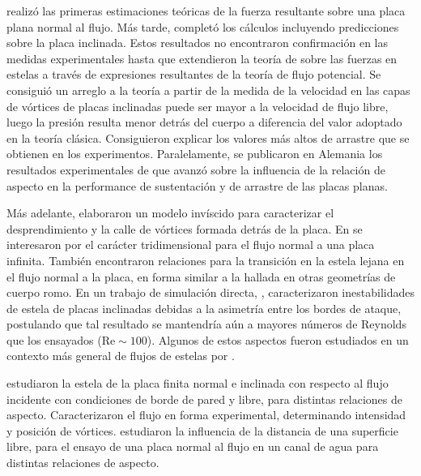 \documentclass[spanish]{article}
\begin{document}
	\citet{kirchhoff1869theorie} realizó las primeras estimaciones teóricas de la fuerza resultante sobre una placa plana normal al flujo. Más tarde, \citet{rayleigh1911xxiii} completó los cálculos incluyendo predicciones sobre la placa inclinada. Estos resultados no encontraron confirmación en las medidas experimentales hasta que \citet{fage1927flow} extendieron la teoría de \citet{vonkarman1911} sobre las fuerzas en estelas a través de expresiones resultantes de la teoría de flujo potencial. Se consiguió un arreglo a la teoría a partir de la medida de la velocidad en las capas de vórtices de placas inclinadas puede ser mayor a la velocidad de flujo libre, luego la presión resulta menor detrás del cuerpo a diferencia del valor adoptado en la teoría clásica. Consiguieron explicar los valores más altos de arrastre que se obtienen en los experimentos.
		Paralelamente, se publicaron  en Alemania los resultados experimentales de \citet{flachsbart1932} que avanzó sobre la influencia de la relación de aspecto en la performance de sustentación y de arrastre de las placas planas.
	
	
	Más adelante, \citet{kiya1977contribution} elaboraron un modelo invíscido para caracterizar el desprendimiento y la calle de vórtices formada detrás de la placa. En \cite{najjar1995effects, najjar1998low} se interesaron por el carácter tridimensional para el flujo normal a una placa infinita. También \cite{saha2007far} encontraron relaciones para la transición en la estela lejana en el flujo normal a la placa, en forma similar a la hallada en otras geometrías de cuerpo romo. En un trabajo de simulación directa, \cite{yang2012vortex}, caracterizaron inestabilidades de estela de placas inclinadas debidas a la asimetría entre los bordes de ataque, postulando que tal resultado se mantendría aún a mayores números de Reynolds que los ensayados ($\mathrm{Re}\sim100$). Algunos de estos aspectos fueron estudiados en un contexto más general de flujos de estelas por \cite{panesar2023oblique}.

	\cite{gomez2022wake} estudiaron la estela de la placa finita normal e inclinada con respecto al flujo incidente con condiciones de borde de pared y libre, para distintas relaciones de aspecto. Caracterizaron el flujo en forma experimental, determinando intensidad y posición de vórtices. \cite{satheesh2019effect} estudiaron la influencia de la distancia de una superficie libre, para el ensayo de una placa normal al flujo en un canal de agua para distintas relaciones de aspecto.
	
\end{document}

